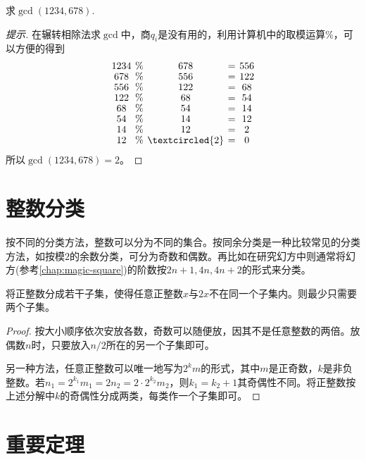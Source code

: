 \begin{example}
  求$\gcd(1234,678).$
\end{example}
\begin{proof}[提示]在辗转相除法求$\gcd$中，商$q_i$是没有用的，利用计算机中的取模运算\%，可以方便的得到
  \begin{align*}\renewcommand{\arraystretch}{.9}\setlength{\arraycolsep}{2pt}
    \begin{array}{ccccc}
      1234 & \% & 678 & = & 556\\
      678  & \% & 556 & = & 122\\
      556  & \% & 122 & = & 68\\
      122  & \% & 68  & = & 54\\
      68   & \% & 54  & = & 14\\
      54   & \% & 14  & = & 12\\
      14   & \% & 12  & = & 2\\
      12   & \% & \textcircled{2}   & = & 0
    \end{array}
  \end{align*}
  所以$\gcd(1234,678)=2$。
\end{proof}

\section{整数分类}
\label{sec:category}

按不同的分类方法，整数可以分为不同的集合。按同余分类是一种比较常见的分类方法，如按模$2$的余数分类，可分为奇数和偶数。再比如在研究幻方中则通常将幻方(参考\ref{chap:magic-square})的阶数按$2n+1, 4n, 4n+2$的形式来分类。

\begin{example}
  将正整数分成若干子集，使得任意正整数$x$与$2x$不在同一个子集内。则最少只需要两个子集。
\end{example}
\begin{proof}
  按大小顺序依次安放各数，奇数可以随便放，因其不是任意整数的两倍。放偶数$n$时，只要放入$n/2$所在的另一个子集即可。

  另一种方法，任意正整数可以唯一地写为$2^km$的形式，其中$m$是正奇数，$k$是非负整数。若$n_1=2^{k_1}m_1 = 2n_2=2\cdot 2^{k_2}m_2$，则$k_1=k_2+1$其奇偶性不同。将正整数按上述分解中$k$的奇偶性分成两类，每类作一个子集即可。
\end{proof}

\section{重要定理}
\label{sec:important-thorems-of-number-theory}

